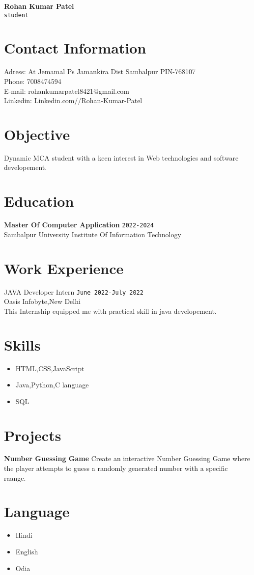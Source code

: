 \documentclass[a4paper,10pt]{article}
\begin{document}
\begin{center}

\textbf{\LARGE Rohan Kumar Patel}\\[0.5em]
\texttt{student}

\end{center}

\section*{Contact Information}
Adress: At Jemamal Ps Jamankira Dist Sambalpur PIN-768107\\
Phone: 7008474594\\
E-mail: rohankumarpatel8421@gmail.com\\
Linkedin: Linkedin.com//Rohan-Kumar-Patel 

\section*{Objective}
Dynamic MCA student with a keen interest in Web technologies and software developement.

\section*{Education}
\textbf{Master Of Computer Application} \hfill\texttt{2022-2024}\\
Sambalpur University Institute Of Information Technology

\section*{Work Experience}
JAVA Developer Intern \hfill\texttt{June 2022-July 2022} \\
Oasis Infobyte,New Delhi\\
This Internship equipped me with practical skill in java developement.

\section*{Skills}
\begin{itemize}
	\item HTML,CSS,JavaScript
	\item Java,Python,C language
	\item SQL

\end{itemize}

\section*{Projects}
\textbf{Number Guessing Game}
Create an interactive Number Guessing Game where the player attempts to guess a randomly generated number with a specific raange.

\section*{Language}
\begin{itemize}
	\item Hindi
	\item English
	\item Odia
\end{itemize}  
\end{document}
